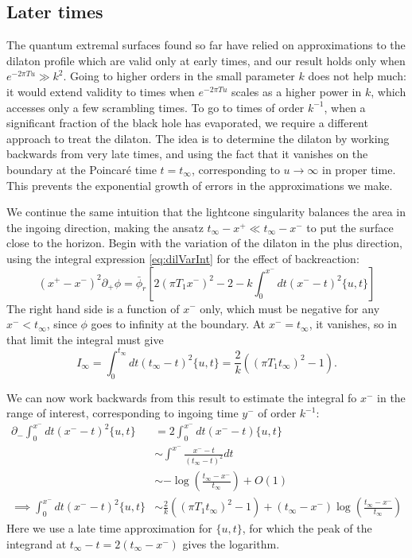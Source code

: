 \documentclass[12pt]{article}
\begin{document}
\subsection{Later times}\label{ssec:later}

The quantum extremal surfaces found so far have relied on approximations to the dilaton profile which are valid only at early times, and our result holds only when $e^{-2\pi T u} \gg k^2$. Going to higher orders in the small parameter $k$ does not help much: it would extend validity to times when $e^{-2\pi T u}$ scales as a higher power in $k$, which accesses only a few scrambling times. To go to times of order $k^{-1}$, when a significant fraction of the black hole has evaporated, we require a different approach to treat the dilaton. The idea is to determine the dilaton by working backwards from very late times, and using the fact that it vanishes on the boundary at the Poincar\'e time $t=t_\infty$, corresponding to $u\to \infty$ in proper time. This prevents the exponential growth of errors in the approximations we make.


 We continue the same intuition that the lightcone singularity balances the area in the ingoing direction, making the ansatz $ t_\infty -x^+ \ll t_\infty -x^-$ to put the surface close to the horizon. Begin with the variation of the dilaton in the plus direction, using the integral expression \eqref{eq:dilVarInt} for the effect of backreaction:
\begin{equation}
	(x^+-x^-)^2 \partial_+ \phi = \bar{\phi}_r \left[2(\pi T_1 x^-)^2-2-k \int_0^{x^-} dt (x^--t)^2 \{u,t\} \right]
\end{equation}
The right hand side is a function of $x^-$ only, which must be negative for any $x^-<t_\infty$, since $\phi$ goes to infinity at the boundary. At $x^-=t_\infty$, it vanishes, so in that limit the integral must give
\begin{equation}
	I_\infty = \int_0^{t_\infty} dt (t_\infty-t)^2 \{u,t\} = \frac{2}{k}((\pi T_1 t_\infty)^2-1).
\end{equation}

We can now work backwards from this result to estimate the integral fo $x^-$ in the range of interest, corresponding to ingoing time $y^-$ of order $k^{-1}$:
\begin{align*}
	\partial_- \int_0^{x^-} dt (x^--t)^2 \{u,t\} &= 2\int_0^{x^-}dt (x^--t)\{u,t\} \\
	&\sim \int^{x^-} \frac{x^--t}{(t_\infty -t)^2} dt \\
	&\sim -\log\left(\frac{t_\infty-x^-}{t_\infty}\right)+O(1) \\
	\implies \int_0^{x^-} dt (x^--t)^2 \{u,t\}&\sim \tfrac{2}{k}((\pi T_1 t_\infty)^2-1) + (t_\infty-x^-)\log\left(\frac{t_\infty-x^-}{t_\infty}\right)
\end{align*}
Here we use a late time approximation for $\{u,t\}$, for which the peak of the integrand at $t_\infty-t= 2(t_\infty-x^-)$ gives the logarithm.
\end{document}
